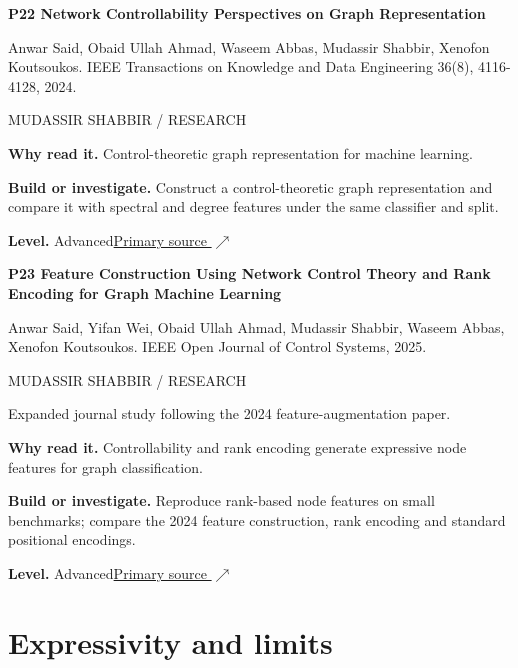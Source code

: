\documentclass[11pt,letterpaper]{article}
\begin{document}
\begin{minipage}{\linewidth}
{\large\bfseries P22 Network Controllability Perspectives on Graph Representation}\par
Anwar Said, Obaid Ullah Ahmad, Waseem Abbas, Mudassir Shabbir, Xenofon Koutsoukos. IEEE Transactions on Knowledge and Data Engineering 36(8), 4116-4128, 2024.\par
\textcolor{ink}{\small MUDASSIR SHABBIR / RESEARCH}\par
\textbf{Why read it.} Control-theoretic graph representation for machine learning.\par
\textbf{Build or investigate.} Construct a control-theoretic graph representation and compare it with spectral and degree features under the same classifier and split.\par
\textbf{Level.} Advanced\quad\href{https://doi.org/10.1109/TKDE.2023.3331318}{Primary source $\nearrow$}\par
\end{minipage}\par\vspace{10pt}
\begin{minipage}{\linewidth}
{\large\bfseries P23 Feature Construction Using Network Control Theory and Rank Encoding for Graph Machine Learning}\par
Anwar Said, Yifan Wei, Obaid Ullah Ahmad, Mudassir Shabbir, Waseem Abbas, Xenofon Koutsoukos. IEEE Open Journal of Control Systems, 2025.\par
\textcolor{ink}{\small MUDASSIR SHABBIR / RESEARCH}\par
{\small Expanded journal study following the 2024 feature-augmentation paper.}\par
\textbf{Why read it.} Controllability and rank encoding generate expressive node features for graph classification.\par
\textbf{Build or investigate.} Reproduce rank-based node features on small benchmarks; compare the 2024 feature construction, rank encoding and standard positional encodings.\par
\textbf{Level.} Advanced\quad\href{https://doi.org/10.1109/OJCSYS.2025.3599371}{Primary source $\nearrow$}\par
\end{minipage}\par\vspace{10pt}
\section*{Expressivity and limits}
\end{document}

